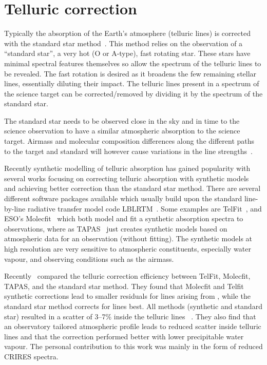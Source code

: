 
\section{Telluric correction}
\label{sec:telluric_correction}

Typically the absorption of the Earth's atmosphere (telluric lines) is corrected with the standard star method~\citep[e.g.][]{vacca_method_2003}.
This method relies on the observation of a ``standard star'', a very hot (O or A-type), fast rotating star.
These stars have minimal spectral features themselves so allow the spectrum of the telluric lines to be revealed. The fast rotation is desired as it broadens the few remaining stellar lines, essentially diluting their impact.
The telluric lines present in a spectrum of the science target can be corrected/removed by dividing it by the spectrum of the standard star.

The standard star needs to be observed close in the sky and in time to the science observation to have a similar atmospheric absorption to the science target. Airmass and molecular composition differences along the different paths to the target and standard will however cause variations in the line strengths~\citep{bailey_correcting_2007}.

Recently synthetic modelling of telluric absorption has gained popularity with several works focusing on correcting telluric absorption with synthetic models~\citep[e.g.][]{bailey_correcting_2007, cotton_atmospheric_2014, seifahrt_synthesising_2010} and achieving better correction than the standard star method.
There are several different software packages available which usually build upon the standard line-by-line radiative transfer model code {LBLRTM}~\citep{clough_linebyline_1995}.
Some examples are {TelFit}~\citep{gullikson_correcting_2014}, and ESO's {Molecfit}~\citep{smette_molecfit_2015} which both model and fit a synthetic absorption spectra to observations, where as {TAPAS}~\citep{bertaux_tapas_2014} just creates synthetic models based on atmospheric data for an observation (without fitting).
The synthetic models at high resolution are very sensitive to atmospheric constituents, especially water vapour, and observing conditions such as the airmass.

Recently~\citet{ulmer-moll_telluric_2018} compared the telluric correction efficiency between {TelFit}, {Molecfit}, {TAPAS}, and the standard star method.
They found that {Molecfit} and {Telfit} synthetic corrections lead to smaller residuals for lines arising from , while the standard star method corrects for  lines best.
All methods (synthetic and standard star) resulted in a scatter of 3--7\% inside the telluric lines ~\citep{ulmer-moll_telluric_2018}.
They also find that an observatory tailored atmospheric profile leads to reduced scatter inside telluric lines and that the correction performed better with lower precipitable water vapour.
The personal contribution to this work was mainly in the form of reduced CRIRES spectra.

